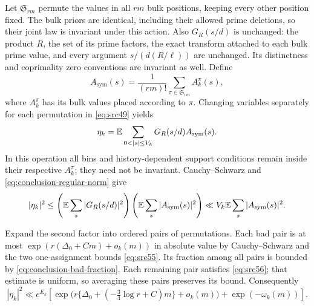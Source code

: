 Let $\mathfrak S_{rm}$ permute the values in all $rm$ bulk positions,
keeping every other position fixed.  The bulk priors are identical,
including their allowed prime deletions, so their joint law is
invariant under this action.  Also $G_R(s/d)$ is unchanged: the product
$R$, the set of its prime factors, the exact transform attached to each
bulk prime value, and every argument $s/(d(R/\ell))$ are unchanged.
Its distinctness and coprimality zero conventions are invariant as
well.  Define
\begin{equation}\label{eq:conclusion-symmetrization}
 A_{\mathrm{sym}}(s)
   =\frac1{(rm)!}\sum_{\pi\in\mathfrak S_{rm}}A_k^\pi(s),
\end{equation}
where $A_k^\pi$ has its bulk values placed according to $\pi$.
Changing variables separately for each permutation in
\eqref{eq:src49} yields
\[
 \eta_k=\E\sum_{0<|s|\le V_k}G_R(s/d)A_{\mathrm{sym}}(s).
\]
In this operation all bins and history-dependent support conditions
remain inside their respective $A_k^\pi$; they need not be invariant.
Cauchy--Schwarz and \eqref{eq:conclusion-regular-norm} give
\begin{equation}\label{eq:conclusion-cauchy-schwarz}
 |\eta_k|^2
 \le\left(\mathbb E\sum_s|G_R(s/d)|^2\right)
        \left(\mathbb E\sum_s|A_{\mathrm{sym}}(s)|^2\right)
 \ll V_k\mathbb E\sum_s|A_{\mathrm{sym}}(s)|^2.
\end{equation}

Expand the second factor into ordered pairs of permutations.  Each
bad pair is at most
$\exp(r(\Delta_0+Cm)+o_k(m))$ in absolute value by Cauchy--Schwarz and
the two one-assignment bounds \eqref{eq:src55}.  Its fraction among all
pairs is bounded by \eqref{eq:conclusion-bad-fraction}.  Each remaining
pair satisfies \eqref{eq:src56}; that estimate is uniform, so averaging
these pairs preserves its bound.  Consequently
\begin{equation}\label{eq:conclusion-final-upper}
 |\eta_k|^2\ll e^{E_k}
 \left[
 \exp\bigl(r\{\Delta_0+(-\tfrac34\log r+C)m\}+o_k(m)\bigr)
       +\exp(-\omega_k(m))
 \right].
\end{equation}

